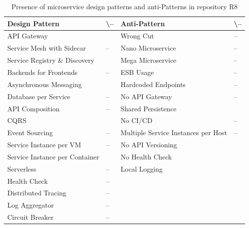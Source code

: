 \documentclass{Configuration_Files/PoliMi3i_thesis}
\newcommand{\cmark}{\ding{51}}%
\begin{document}
\begin{table}[H]
\centering 
    \begin{tabular}{ 
  | >{\centering\arraybackslash} m{16em} 
  | >{\centering\arraybackslash} m{2.2em} 
  | >{\centering\arraybackslash} m{16em} 
  | >{\centering\arraybackslash} m{2.2em} | }
    \hline
    \rowcolor{bluepoli!40}
    \textbf{Design Pattern} & \cmark \textbackslash – & \textbf{Anti-Pattern} & \cmark \textbackslash – \T\B \\
    \hline \hline
    API Gateway & \cmark & Wrong Cut & – \T\B\\
    \hline
    \rowcolor{bluepoli!10}
    Service Mesh with Sidecar & – & Nano Microservice & – \T\B \\
    \hline
    Service Registry \& Discovery & \cmark & Mega Microservice & – \T\B \\
    \hline
    \rowcolor{bluepoli!10}
    Backends for Frontends & – & ESB Usage & – \T\B \\
    \hline
    Asynchronous Messaging & \cmark & Hardcoded Endpoints & – \T\B \\
    \hline
    \rowcolor{bluepoli!10}
    Database per Service & – & No API Gateway & – \T\B \\
    \hline
    API Composition & – & Shared Persistence & \cmark \T\B \\
    \hline
    \rowcolor{bluepoli!10}
    CQRS & \cmark & No CI/CD & – \T\B \\
    \hline
    Event Sourcing & – & Multiple Service Instances per Host & – \T\B \\
    \hline
    \rowcolor{bluepoli!10}
    Service Instance per VM & – & No API Versioning & \cmark \T\B \\
    \hline
    Service Instance per Container & \cmark & No Health Check & \cmark \T\B \\
    \hline
    \rowcolor{bluepoli!10}
    Serverless & – & Local Logging & \cmark \T\B \\
    \hline
    Health Check & – &  & \T\B \\
    \hline
    \rowcolor{bluepoli!10}
    Distributed Tracing & – & & \T\B \\
    \hline
    Log Aggregator & – &  & \T\B \\
    \hline
    \rowcolor{bluepoli!10}
    Circuit Breaker & – &  & \T\B \\
    \hline
    \end{tabular}
    \\[10pt]
    \caption{Presence of microservice design patterns and anti-Patterns in repository R8}
    \label{table:R8_result}
\end{table}
\end{document}
